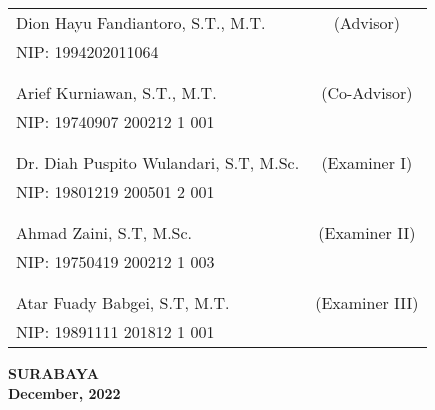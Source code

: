     \noindent
    \begin{tabularx}{\textwidth}{X c}
      Dion Hayu Fandiantoro, S.T., M.T.     & (Advisor) \\
      NIP: 1994202011064                    & \\
      &  \\
      &  \\
      Arief Kurniawan, S.T., M.T.           & (Co-Advisor) \\
      NIP: 19740907 200212 1 001            & \\
      &  \\
      &  \\
      Dr. Diah Puspito Wulandari, S.T, M.Sc.                    & (Examiner I) \\
      NIP: 19801219 200501 2 001                                & \\
      &  \\
      &  \\
      Ahmad Zaini, S.T, M.Sc.                                   & (Examiner II) \\
      NIP: 19750419 200212 1 003                                & \\
      &  \\
      &  \\
      Atar Fuady Babgei, S.T, M.T.                              & (Examiner III) \\
      NIP: 19891111 201812 1 001                                & \\
    \end{tabularx}
  \endgroup

  \vspace{4ex}

  \begin{center}
    \textbf{SURABAYA} \\
    \textbf{December, 2022}
  \end{center}
\endgroup
